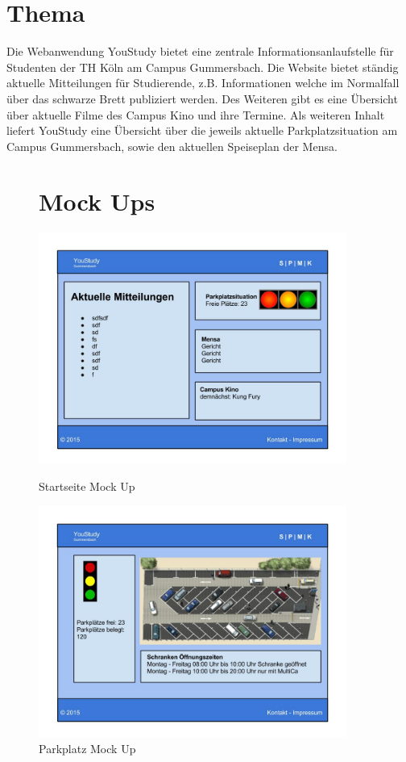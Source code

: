 \chapter{Thema}
Die Webanwendung YouStudy bietet eine zentrale Informationsanlaufstelle für Studenten der TH Köln am Campus Gummersbach. Die Website bietet ständig aktuelle Mitteilungen für Studierende, z.B. Informationen welche im Normalfall über das schwarze Brett publiziert werden. Des Weiteren gibt es eine Übersicht über aktuelle Filme des Campus Kino und ihre Termine. Als weiteren Inhalt liefert YouStudy eine Übersicht über die jeweils aktuelle Parkplatzsituation am Campus Gummersbach, sowie den aktuellen Speiseplan der Mensa.


\begin{figure}[ht]
\chapter{Mock Ups}
\includegraphics[width=0.9\textwidth]{./img/Startseite}\caption{Startseite Mock Up}\label{fig1}
\includegraphics[width=0.9\textwidth]{./img/Parkplatz}\caption{Parkplatz Mock Up}\label{fig2}
\end{figure}

